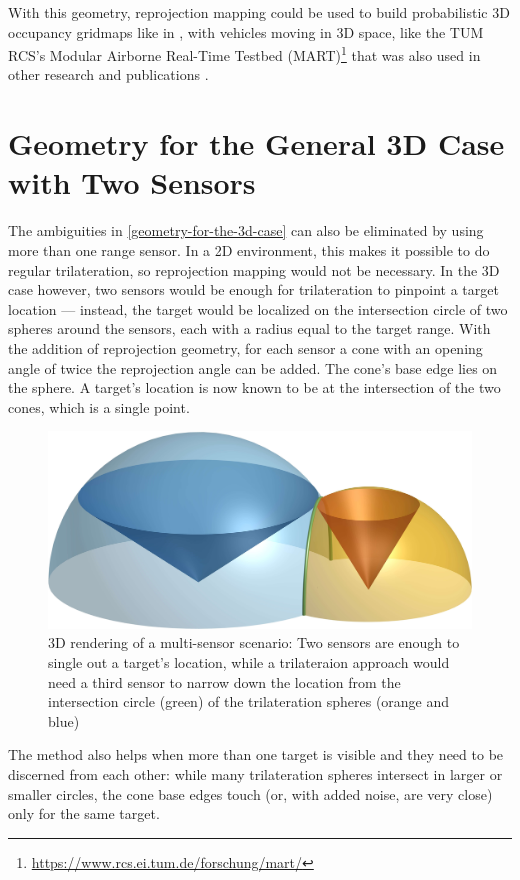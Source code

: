 With this geometry, reprojection mapping could be used to build probabilistic 3D occupancy gridmaps like in \cite{Hornung2013}, with vehicles moving in 3D space, like the TUM RCS's Modular Airborne Real-Time Testbed (MART)\footnote{\url{https://www.rcs.ei.tum.de/forschung/mart/}} that was also used in other research and publications \cite{Becker2015}.

\section{Geometry for the General 3D Case with Two Sensors} \label{multisensor}
The ambiguities in \cref{geometry-for-the-3d-case} can also be eliminated by using more than one range sensor. In a 2D environment, this makes it possible to do regular trilateration, so reprojection mapping would not be necessary. In the 3D case however, two sensors would be enough for trilateration to pinpoint a target location --- instead, the target would be localized on the intersection circle of two spheres around the sensors, each with a radius equal to the target range. With the addition of reprojection geometry, for each sensor a cone with an opening angle of twice the reprojection angle can be added. The cone's base edge lies on the sphere. A target's location is now known to be at the intersection of the two cones, which is a single point.

\begin{figure}
    \centering
    \includegraphics[max width=.75\textwidth]{gfx/diagrams/multisensor.jpg}
    \caption{3D rendering of a multi-sensor scenario: Two sensors are enough to single out a target's location, while a trilateraion approach would need a third sensor to narrow down the location from the intersection circle (green) of the trilateration spheres (orange and blue)}
    \label{fig:multisensor}
\end{figure}

The method also helps when more than one target is visible and they need to be discerned from each other: while many trilateration spheres intersect in larger or smaller circles, the cone base edges touch (or, with added noise, are very close) only for the same target.

